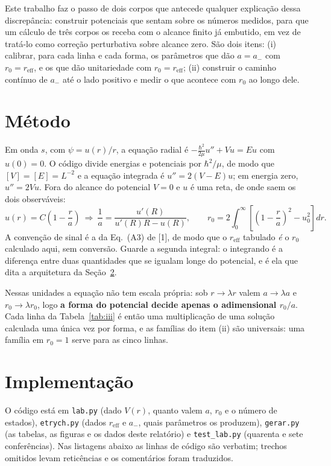 \documentclass[11pt,a4paper]{article}
\newcommand{\cod}[1]{\texttt{\small #1}}
\begin{document}
Este trabalho faz o passo de dois corpos que antecede qualquer explicação dessa
discrepância: construir potenciais que sentam sobre os números medidos, para
que um cálculo de três corpos os receba com o alcance finito já embutido, em
vez de tratá-lo como correção perturbativa sobre alcance zero. São dois itens:
(i) calibrar, para cada linha e cada forma, os parâmetros que dão $a=a_-$ com
$r_0=r_\mathrm{eff}$, e os que dão unitariedade com $r_0=r_\mathrm{eff}$;
(ii) construir o caminho contínuo de $a_-$ até o lado positivo e medir o que
acontece com $r_0$ ao longo dele.

\section{Método}

Em onda $s$, com $\psi=u(r)/r$, a equação radial é
$-\frac{\hbar^2}{2\mu}u''+Vu=Eu$ com $u(0)=0$. O código divide energias e
potenciais por $\hbar^2/\mu$, de modo que $[V]=[E]=L^{-2}$ e a equação
integrada é $u''=2(V-E)u$; em energia zero, $u''=2Vu$. Fora do alcance do
potencial $V=0$ e $u$ é uma reta, de onde saem os dois observáveis:
\begin{equation}
  u(r)=C\left(1-\frac ra\right)
  \ \Longrightarrow\
  \frac1a=\frac{u'(R)}{u'(R)R-u(R)},
  \qquad
  r_0=2\int_0^\infty\!\left[\left(1-\frac ra\right)^{2}-u_0^{2}\right]dr .
  \label{eq:ar0}
\end{equation}
A convenção de sinal é a da Eq.~(A3) de [1], de modo que o $r_\mathrm{eff}$
tabulado \emph{é} o $r_0$ calculado aqui, sem conversão. Guarde a segunda
integral: o integrando é a diferença entre duas quantidades que se igualam
longe do potencial, e é ela que dita a arquitetura da Seção~\ref{sec:impl}.

Nessas unidades a equação não tem escala própria: sob $r\to\lambda r$ valem
$a\to\lambda a$ e $r_0\to\lambda r_0$, logo \textbf{a forma do potencial decide
apenas o adimensional $r_0/a$}. Cada linha da Tabela~\ref{tab:iii} é então uma
multiplicação de uma solução calculada uma única vez por forma, e as famílias
do item (ii) são universais: uma família em $r_0=1$ serve para as cinco linhas.

\section{Implementação}
\label{sec:impl}

O código está em \cod{lab.py} (dado $V(r)$, quanto valem $a$, $r_0$ e o número
de estados), \cod{etrych.py} (dados $r_\mathrm{eff}$ e $a_-$, quais parâmetros os
produzem), \cod{gerar.py} (as tabelas, as figuras e os dados deste relatório) e
\cod{test\_lab.py} (quarenta e sete conferências). Nas listagens abaixo as linhas de
código são verbatim; trechos omitidos levam reticências e os comentários foram
traduzidos.
\end{document}
